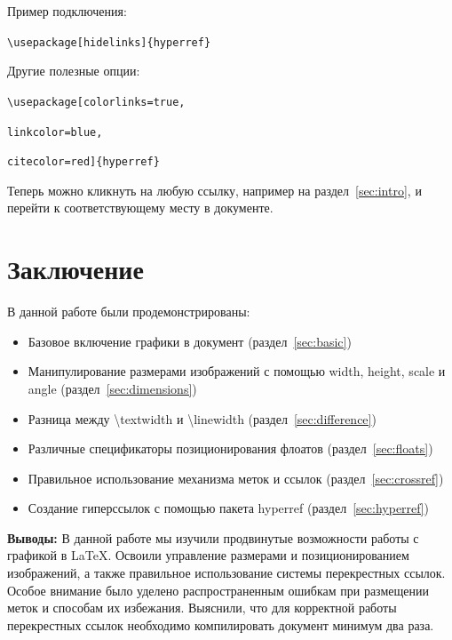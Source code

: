 \documentclass{article}
\begin{document}
  Пример подключения:

  \texttt{\textbackslash usepackage[hidelinks]\{hyperref\}}

  Другие полезные опции:

  \texttt{\textbackslash usepackage[colorlinks=true,}

  \texttt{linkcolor=blue,}

  \texttt{citecolor=red]\{hyperref\}}


  Теперь можно кликнуть на любую ссылку, например на раздел~\ref{sec:intro}, и перейти к соответствующему месту в документе.

  \section{Заключение}
  \label{sec:conclusion}
  
  В данной работе были продемонстрированы:
  \begin{itemize}
    \item Базовое включение графики в документ (раздел~\ref{sec:basic})
    \item Манипулирование размерами изображений с помощью width, height, scale и angle (раздел~\ref{sec:dimensions})
    \item Разница между \textbackslash textwidth и \textbackslash linewidth (раздел~\ref{sec:difference})
    \item Различные спецификаторы позиционирования флоатов (раздел~\ref{sec:floats})
    \item Правильное использование механизма меток и ссылок (раздел~\ref{sec:crossref})
    \item Создание гиперссылок с помощью пакета hyperref (раздел~\ref{sec:hyperref})
  \end{itemize}

  \textbf{Выводы:} В данной работе мы изучили продвинутые возможности работы с графикой в LaTeX. Освоили управление размерами и позиционированием изображений, а также правильное использование системы перекрестных ссылок. Особое внимание было уделено распространенным ошибкам при размещении меток и способам их избежания. Выяснили, что для корректной работы перекрестных ссылок необходимо компилировать документ минимум два раза.
\end{document}
